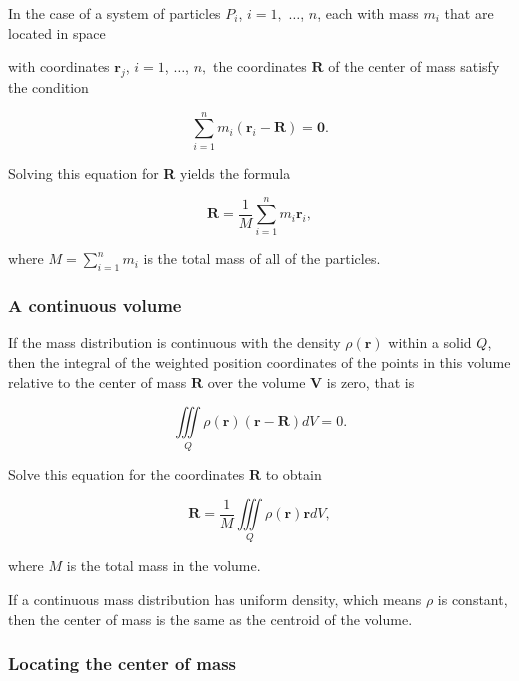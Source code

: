 In the case of a system of particles $P_i$, $i=1,$ $\dots$, $n$, each with mass $m_i$ that are located in space

with coordinates $\mathbf{r} _j$, $i=1$, $\dots$, $n,$ the coordinates $\mathbf{R}$ of the center of mass satisfy the condition


\[
\sum _{i=1}^n m_i(\mathbf{r} _i - \mathbf{R}) = \mathbf{0}.
\]


Solving this equation for \textbf{R} yields the formula


\[
\mathbf{R} = \frac 1M \sum _{i=1}^n m_i \mathbf{r} _i,
\]


where $M = \sum _{i = 1}^n m_i$ is the total mass of all of the particles.


\subsubsection{A continuous volume}
\label{sss:acon-26a8}


If the mass distribution is continuous with the density $\rho(\mathbf{r})$ within a solid $Q$, then the integral of the weighted position coordinates of the points in this volume relative to the center of mass $\mathbf{R}$ over the volume $\mathbf{V}$ is zero, that is


\[
\iiint\limits _{Q} \rho(\mathbf{r})(\mathbf{r}-\mathbf{R})dV = 0.
\]


Solve this equation for the coordinates $\mathbf{R}$ to obtain


\[
\mathbf R = \frac 1M \iiint\limits _{Q}\rho(\mathbf{r}) \mathbf{r} dV,
\]

where $M$ is the total mass in the volume.


If a continuous mass distribution has uniform density, which means $\rho$ is constant, then the center of mass is the same as the centroid of the volume.


\subsubsection{Locating the center of mass}
\label{sss:loca-0ff0}




